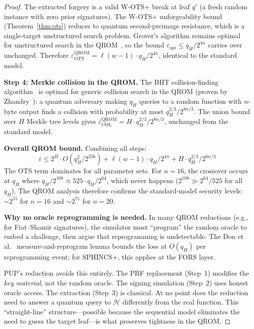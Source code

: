 \documentclass[11pt]{article}
\newcommand{\hash}{\mathcal{H}}
\begin{document}
\begin{proof}
The extracted forgery is a valid W-OTS+ break at leaf $q'$ (a fresh
random instance with zero prior signatures). The W-OTS+ unforgeability
bound (Theorem~\ref{thm:ots}) reduces to quantum second-preimage
resistance, which is a single-target unstructured search problem.
Grover's algorithm remains optimal for unstructured search in the
QROM~\cite{grover}, so the bound $\varepsilon_{\mathrm{spr}} \leq
q_H / 2^{4n}$ carries over unchanged. Therefore
$\varepsilon_{\mathrm{OTS}}^{\mathrm{QROM}} = \ell(w-1) \cdot
q_H / 2^{4n}$, identical to the standard model.

\textbf{Step 4: Merkle collision in the QROM.}
The BHT collision-finding algorithm~\cite{bht} is optimal for generic
collision search in the QROM (proven by Zhandry~\cite{zhandry}): a
quantum adversary making $q_H$ queries to a random function with
$n$-byte output finds a collision with probability at most
$q_H^{2/3} / 2^{8n/3}$. The union bound over $H$ Merkle tree levels
gives $\varepsilon_{\mathrm{COL}}^{\mathrm{QROM}} = H \cdot
q_H^{2/3} / 2^{8n/3}$, unchanged from the standard model.

\textbf{Overall QROM bound.}
Combining all steps:
\[
\varepsilon \leq 2^H \cdot O(q_H^2 / 2^{256}) +
\ell(w-1) \cdot q_H / 2^{4n} +
H \cdot q_H^{2/3} / 2^{8n/3}
\]
The OTS term dominates for all parameter sets. For $n = 16$, the
crossover occurs at $q_H$ where
$q_H / 2^{108} \approx 525 \cdot q_H / 2^{64}$, which never
happens ($2^{108} \gg 2^{64}/525$ for all $q_H$). The QROM analysis
therefore confirms the standard-model security levels:
${\sim}2^{55}$ for $n = 16$ and ${\sim}2^{71}$ for $n = 20$.

\textbf{Why no oracle reprogramming is needed.}
In many QROM reductions (e.g., for Fiat--Shamir signatures), the
simulator must ``program'' the random oracle to embed a challenge,
then argue that reprogramming is undetectable. The
Don et al.~\cite{dongyanglong} measure-and-reprogram lemma
bounds the loss at $O(q_H)$ per reprogramming event; for SPHINCS+,
this applies at the FORS layer.

PUP's reduction avoids this entirely. The PRF replacement (Step~1)
modifies the \emph{key material}, not the random oracle. The signing
simulation (Step~2) uses honest oracle access. The extraction
(Step~3) is classical. At no point does the reduction need to answer
a quantum query to $\hash$ differently from the real function. This
``straight-line'' structure---possible because the sequential model
eliminates the need to guess the target leaf---is what preserves
tightness in the QROM.
\end{proof}
\end{document}
